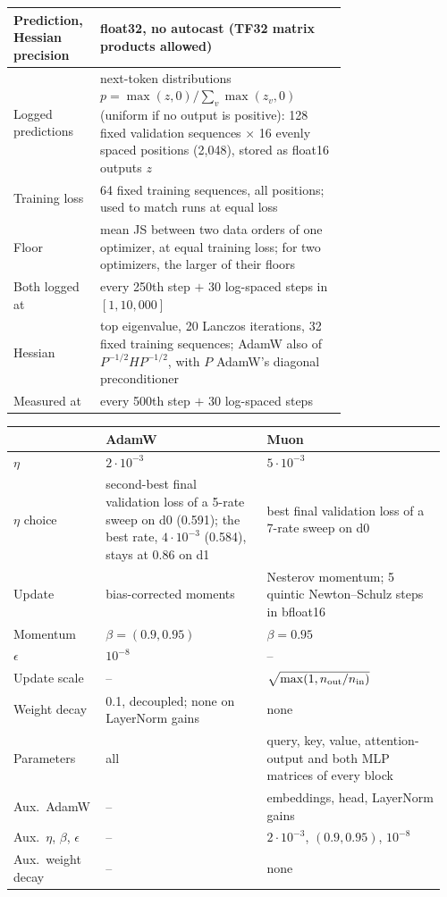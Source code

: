 \begin{center}
\begin{tabular}{@{}lp{0.74\linewidth}@{}}
Prediction, Hessian precision & float32, no autocast (TF32 matrix products allowed) \\
\hline
Logged predictions & next-token distributions $p=\max(z,0)/\sum_v\max(z_v,0)$ (uniform if no output is positive):
  128 fixed validation sequences $\times$ 16 evenly spaced positions (2{,}048), stored as float16 outputs $z$ \\
Training loss & 64 fixed training sequences, all positions; used to match runs at equal loss \\
Floor & mean JS between two data orders of one optimizer, at equal training loss; for two optimizers, the larger
  of their floors \\
Both logged at & every 250th step $+$ 30 log-spaced steps in $[1, 10{,}000]$ \\
\hline
Hessian & top eigenvalue, 20 Lanczos iterations, 32 fixed training sequences; AdamW also of
  $P^{-1/2}HP^{-1/2}$, with $P$ AdamW's diagonal preconditioner \\
Measured at & every 500th step $+$ 30 log-spaced steps \\
\hline
\end{tabular}
\end{center}

\begin{center}\small
\captionsetup{type=table}
\caption{Optimizer-specific hyperparameters. $n_{\rm out}$, $n_{\rm in}$: output and input size of the matrix.}
\label{tab:app-optim}
\setlength{\tabcolsep}{4pt}
\begin{tabular}{@{}p{0.2\linewidth}p{0.36\linewidth}p{0.4\linewidth}@{}}
\hline
 & AdamW & Muon \tabularnewline
\hline
$\eta$ & $2\cdot10^{-3}$ & $5\cdot10^{-3}$ \tabularnewline
$\eta$ choice & \raggedright second-best final validation loss of a 5-rate sweep on d0 (0.591); the best rate,
  $4\cdot10^{-3}$ (0.584), stays at 0.86 on d1 & \raggedright best final validation loss of a 7-rate sweep on d0
  \tabularnewline
Update & bias-corrected moments & \raggedright Nesterov momentum; 5 quintic Newton--Schulz steps in bfloat16 \tabularnewline
Momentum & $\beta=(0.9,0.95)$ & $\beta=0.95$ \tabularnewline
$\epsilon$ & $10^{-8}$ & -- \tabularnewline
Update scale & -- & $\sqrt{\max(1,n_{\rm out}/n_{\rm in})}$ \tabularnewline
Weight decay & \raggedright 0.1, decoupled; none on LayerNorm gains & none \tabularnewline
Parameters & all & \raggedright query, key, value, attention-output and both MLP matrices of every block \tabularnewline
\hline
Aux.\ AdamW & -- & embeddings, head, LayerNorm gains \tabularnewline
Aux.\ $\eta$, $\beta$, $\epsilon$ & -- & $2\cdot10^{-3}$, $(0.9,0.95)$, $10^{-8}$ \tabularnewline
Aux.\ weight decay & -- & none \tabularnewline
\hline
\end{tabular}
\end{center}


